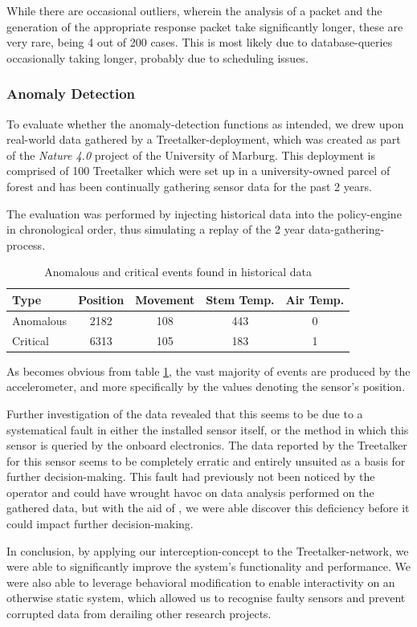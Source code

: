 While there are occasional outliers, wherein the analysis of a packet and the generation of the appropriate response packet take significantly longer, these are very rare, being 4 out of 200 cases.
This is most likely due to database-queries occasionally taking longer, probably due to scheduling issues.

\subsubsection{Anomaly Detection}
\label{sec:evaluation:anomaly-detection}

To evaluate whether the anomaly-detection functions as intended, we drew upon real-world data gathered by a Treetalker-deployment, which was created as part of the \textit{Nature 4.0} project of the University of Marburg.
This deployment is comprised of 100 Treetalker which were set up in a university-owned parcel of forest and has been continually gathering sensor data for the past 2 years.

The evaluation was performed by injecting historical data into the policy-engine in chronological order, thus simulating a replay of the 2 year data-gathering-process.

\begin{table}[tb]
    \centering
    \caption{Anomalous and critical events found in historical data}
    \label{tab:evaluation:anomalies}
    \begin{tabular}{lcccc}
        \toprule
        Type & Position & Movement & Stem Temp. & Air Temp.  \\ \midrule
        Anomalous & 2182 & 108 & 443 & 0 \\
        Critical & 6313 & 105 & 183 & 1 \\
        \bottomrule
    \end{tabular}
\end{table}

As becomes obvious from table \ref{tab:evaluation:anomalies}, the vast majority of events are produced by the accelerometer, and more specifically by the values denoting the sensor's position.

Further investigation of the data revealed that this seems to be due to a systematical fault in either the installed sensor itself, or the method in which this sensor is queried by the onboard electronics.
The data reported by the Treetalker for this sensor seems to be completely erratic and entirely unsuited as a basis for further decision-making.
This fault had previously not been noticed by the operator and could have wrought havoc on data analysis performed on the gathered data, but with the aid of \ttt, we were able discover this deficiency before it could impact further decision-making.

In conclusion, by applying our interception-concept to the Treetalker-network, we were able to significantly improve the system's functionality and performance.
We were also able to leverage behavioral modification to enable interactivity on an otherwise static system, which allowed us to recognise faulty sensors and prevent corrupted data from derailing other research projects.
